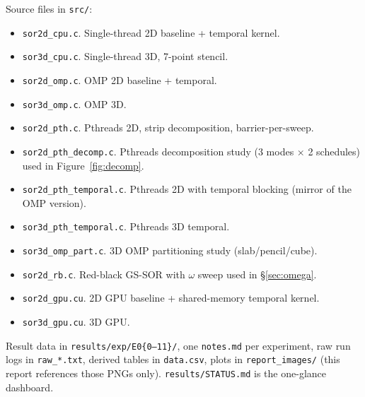 \documentclass[11pt]{article}
\begin{document}
Source files in \texttt{src/}:

\begin{itemize}[leftmargin=1.4em,itemsep=1pt,topsep=1pt]
  \item \texttt{sor2d\_cpu.c}. Single-thread 2D baseline + temporal
        kernel.
  \item \texttt{sor3d\_cpu.c}. Single-thread 3D, 7-point stencil.
  \item \texttt{sor2d\_omp.c}. OMP 2D baseline + temporal.
  \item \texttt{sor3d\_omp.c}. OMP 3D.
  \item \texttt{sor2d\_pth.c}. Pthreads 2D, strip decomposition,
        barrier-per-sweep.
  \item \texttt{sor2d\_pth\_decomp.c}. Pthreads decomposition study
        (3 modes $\times$ 2 schedules) used in
        Figure~\ref{fig:decomp}.
  \item \texttt{sor2d\_pth\_temporal.c}. Pthreads 2D with temporal
        blocking (mirror of the OMP version).
  \item \texttt{sor3d\_pth\_temporal.c}. Pthreads 3D temporal.
  \item \texttt{sor3d\_omp\_part.c}. 3D OMP partitioning study
        (slab/pencil/cube).
  \item \texttt{sor2d\_rb.c}. Red-black GS-SOR with $\omega$ sweep
        used in §\ref{sec:omega}.
  \item \texttt{sor2d\_gpu.cu}. 2D GPU baseline + shared-memory
        temporal kernel.
  \item \texttt{sor3d\_gpu.cu}. 3D GPU.
\end{itemize}

\noindent Result data in \texttt{results/exp/E0\{0--11\}/}, one
\texttt{notes.md} per experiment, raw run logs in
\texttt{raw\_*.txt}, derived tables in \texttt{data.csv}, plots in
\texttt{report\_images/} (this report references those PNGs only).
\texttt{results/STATUS.md} is the one-glance dashboard.
\end{document}
